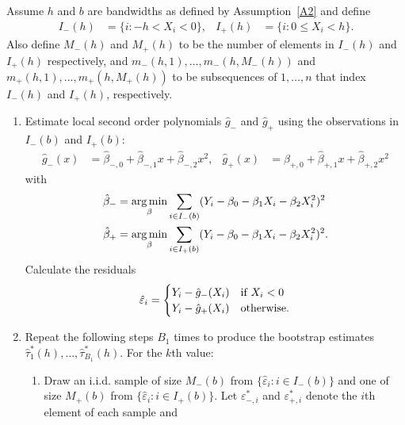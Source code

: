 \documentclass[12pt,fleqn]{article}
\begin{document}
\begin{algorithm}\label{Alg1}
  Assume $h$ and $b$ are bandwidths as defined by Assumption~\ref{A2} and define
  \begin{align*}
    I_{-}(h) &= \{i : -h < X_{i} < 0\}, &
    I_{+}(h) &= \{i : 0 \leq X_{i} < h\}.
  \end{align*}
  Also define $M_{-}(h)$ and $M_{+}(h)$ to be the number of elements in $I_{-}(h)$ and
  $I_{+}(h)$ respectively, and $m_{-}(h,1),\dots,m_{-}(h,M_{-}(h))$ and
  $m_{+}(h,1),\dots,m_{+}(h,M_+(h))$ to be subsequences of $1,\dots,n$ that index
  $I_{-}(h)$ and $I_{+}(h)$, respectively.
  \begin{enumerate}
  \item Estimate local second order polynomials $\hat g_{-}$ and $\hat g_{+}$ using
    the observations in $I_{-}(b)$ and $I_{+}(b)$:
    \begin{align}
      \label{eq:2}
      \hat g_{-}(x)
      &= \hat\beta_{-,0} + \hat\beta_{-,1} x + \hat\beta_{-,2} x^{2},
      &\hat g_{+}(x)
      &= \hat\beta_{+,0} + \hat\beta_{+,1} x + \hat\beta_{+,2} x^{2}
    \end{align}
    with
    \begin{align*}
      \hat\beta_{-} &= \operatorname*{arg\,min}_\beta \sum_{i \in I_-(b)}
      (Y_i - \beta_0 - \beta_1 X_i - \beta_2 X_i^2)^2 \\
      \hat\beta_{+} &= \operatorname*{arg\,min}_\beta \sum_{i \in I_+(b)}
      (Y_i - \beta_0 - \beta_1 X_i - \beta_2 X_i^2)^2.
    \end{align*}
    Calculate the residuals
    \begin{equation}
      \label{eq:3}
      \hat\varepsilon_{i} =
      \begin{cases}
        Y_{i} - \hat g_-(X_{i}) & \text{if}\ X_{i} < 0 \\
        Y_{i} - \hat g_+(X_{i}) & \text{otherwise}.
      \end{cases}
    \end{equation}
  \item Repeat the following steps $B_{1}$ times to produce the
    bootstrap estimates $\hat{\tau}_{1}^{*}(h),\dots,\hat\tau_{B_{1}}^{*}(h)$. For the
    $k$th value:
    \begin{enumerate}
    \item Draw an i.i.d. sample of size $M_-(b)$ from
      $\{\hat\varepsilon_i : i \in I_-(b)\}$ and one of size $M_+(b)$ from
      $\{\hat\varepsilon_i : i \in I_+(b)\}$. Let $\varepsilon_{-,i}^{*}$ and
      $\varepsilon_{+,i}^{*}$ denote the $i$th element of each sample and

\end{enumerate}
\end{enumerate}
\end{algorithm}
\end{document}
